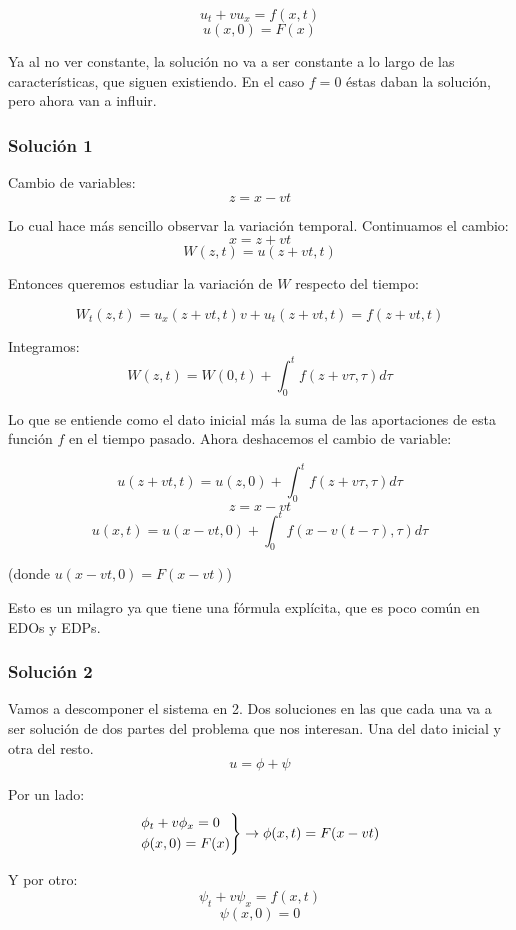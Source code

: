 		$$u_t + vu_x = f(x,t)$$
		$$u(x,0) = F(x)$$

		Ya al no ver constante, la solución no va a ser constante a lo largo de las características, que siguen existiendo. En el caso $f = 0$ éstas daban la solución, pero ahora van a influir.
		

		\subsubsection{Solución 1}

			Cambio de variables:
			$$z = x-vt$$

			Lo cual hace más sencillo observar la variación temporal. Continuamos el cambio:
			$$x = z + vt$$
			$$W(z,t) = u(z+vt, t)$$

			Entonces queremos estudiar la variación de $W$ respecto del tiempo:

			$$W_t(z,t) = u_x(z + vt, t)v + u_t(z+vt, t) = f(z + vt, t)$$

			Integramos:
			$$W(z,t) = W(0,t) + \int^{t}_{0} f(z+v\tau, \tau) d\tau $$

			Lo que se entiende como el dato inicial más la suma de las aportaciones de esta función $f$ en el tiempo pasado. Ahora deshacemos el cambio de variable:

			$$u(z + vt, t) = u(z,0) + \int^{t}_{0} f(z+v\tau, \tau) d\tau$$
			$$z = x-vt$$
			$$u(x,t) = u(x-vt,0)+ \int^{t}_{0} f(x-v(t-\tau),\tau) d\tau$$

			(donde $u(x-vt,0) = F(x-vt)$)

			Esto es un milagro ya que tiene una fórmula explícita, que es poco común en EDOs y EDPs.

		\subsubsection{Solución 2}

			Vamos a descomponer el sistema en 2. Dos soluciones en las que cada una va a ser solución de dos partes del problema que nos interesan. Una del dato inicial y otra del resto.
			$$u = \phi + \psi$$

			Por un lado:
			$$
			\begin{rcases}
				\phi_t + v\phi_x = 0 \\
				\phi(x,0) = F(x)
			\end{rcases}
			\rightarrow \phi(x,t) = F(x-vt)
			$$

			Y por otro:
			$$\psi_t + v\psi_x = f(x,t)$$
			$$\psi(x,0) = 0$$

